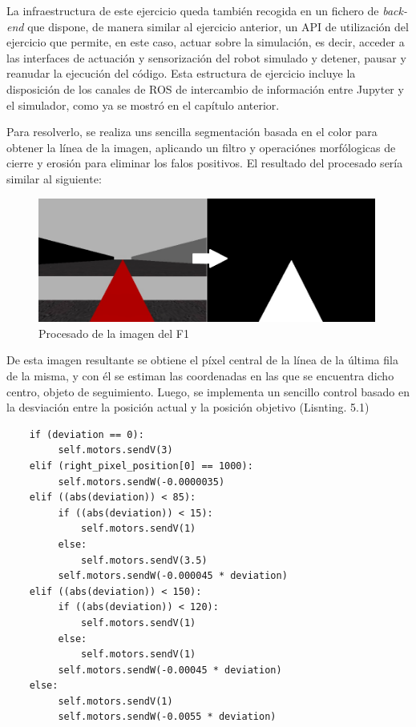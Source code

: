 La infraestructura de este ejercicio queda también recogida en un fichero de \textit{back-end} que dispone, de manera similar al ejercicio anterior, un API de utilización del ejercicio que permite, en este caso, actuar sobre la simulación, es decir, acceder a las interfaces de actuación y sensorización del robot simulado y detener, pausar y reanudar la ejecución del código. Esta estructura de ejercicio incluye la disposición de los canales de ROS de intercambio de información entre Jupyter y el simulador, como ya se mostró en el capítulo anterior.

Para resolverlo, se realiza uns sencilla segmentación basada en el color para obtener la línea de la imagen, aplicando un filtro y operaciónes morfólogicas de cierre y erosión para eliminar los falos positivos. El resultado del procesado sería similar al siguiente:

\begin{figure}[!hbtp]  \centering\noindent
    \includegraphics[width=0.99\textwidth]{figures/fl_process.png}
    \caption{Procesado de la imagen del F1}
    \label{fl_process}
\end{figure}

De esta imagen resultante se obtiene el píxel central de la línea de la última fila de la misma, y con él se estiman las coordenadas en las que se encuentra dicho centro, objeto de seguimiento. Luego, se implementa un sencillo control basado en la desviación entre la posición actual y la posición objetivo (Lisnting. 5.1)

\begin{verbatim}
    if (deviation == 0):
         self.motors.sendV(3)
    elif (right_pixel_position[0] == 1000):
         self.motors.sendW(-0.0000035)
    elif ((abs(deviation)) < 85):
         if ((abs(deviation)) < 15):
             self.motors.sendV(1)
         else:
             self.motors.sendV(3.5)
         self.motors.sendW(-0.000045 * deviation)
    elif ((abs(deviation)) < 150):
         if ((abs(deviation)) < 120):
             self.motors.sendV(1)
         else:
             self.motors.sendV(1)
         self.motors.sendW(-0.00045 * deviation)
    else:
         self.motors.sendV(1)
         self.motors.sendW(-0.0055 * deviation)
\end{verbatim}
\begin{lstlisting}[caption=Control basado en desviación]
\end{lstlisting}

